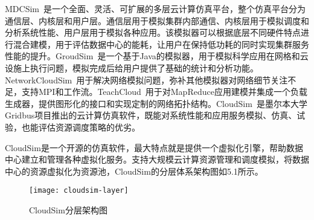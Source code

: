 MDCSim~\cite{Lim2009MDCSim}是一个全面、灵活、可扩展的多层云计算仿真平台，整个仿真平台分为通信层、内核层和用户层。通信层用于模拟集群内部通信、内核层用于模拟调度和分析系统性能、用户层用于模拟各种应用。该模拟器可以根据底层不同硬件特点进行混合建模，用于评估数据中心的能耗，让用户在保持低功耗的同时实现集群服务性能的提升。GroudSim~\cite{Ostermann2011GroudSim}是一个基于Java的模拟器，用于模拟科学应用在网格和云设施上执行问题，模拟完成后给用户提供了基础的统计和分析功能。NetworkCloudSim~\cite{Garg2012NetworkCloudSim}用于解决网络模拟问题，弥补其他模拟器对网络细节关注不足，支持MPI和工作流。TeachCloud~\cite{Jararweh2013TeachCloud}用于对MapReduce应用建模并集成一个负载生成器，提供图形化的接口和实现定制的网络拓扑结构。CloudSim~\cite{Calheiros2009CloudSim}是墨尔本大学Gridbus项目推出的云计算仿真软件，既能对系统性能和应用服务模拟、仿真、试验，也能评估资源调度策略的优劣。

CloudSim是一个开源的仿真软件，最大特点就是提供一个虚拟化引擎，帮助数据中心建立和管理各种虚拟化服务。支持大规模云计算资源管理和调度模拟，将数据中心的资源虚拟化为资源池，CloudSim的分层体系架构图如5.1所示。
\begin{figure}[H] %
	\centering
	\texttt{[image: cloudsim-layer]}
	\caption{CloudSim分层架构图}
	\label{fig:xfig1}
\end{figure}

